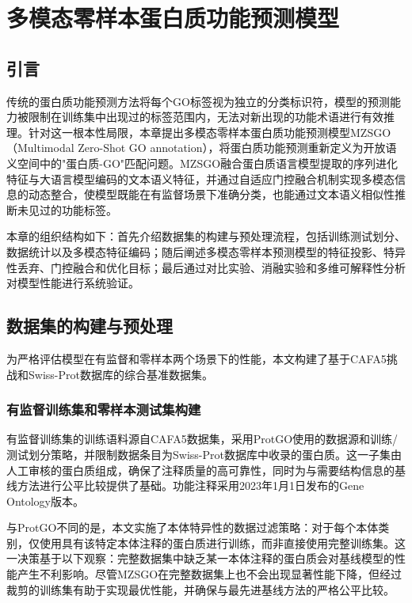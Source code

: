 
\chapter{多模态零样本蛋白质功能预测模型}

\section{引言}

传统的蛋白质功能预测方法将每个GO标签视为独立的分类标识符，模型的预测能力被限制在训练集中出现过的标签范围内，无法对新出现的功能术语进行有效推理。针对这一根本性局限，本章提出多模态零样本蛋白质功能预测模型MZSGO（Multimodal Zero-Shot GO annotation），将蛋白质功能预测重新定义为开放语义空间中的"蛋白质-GO"匹配问题。MZSGO融合蛋白质语言模型提取的序列进化特征与大语言模型编码的文本语义特征，并通过自适应门控融合机制实现多模态信息的动态整合，使模型既能在有监督场景下准确分类，也能通过文本语义相似性推断未见过的功能标签。

本章的组织结构如下：首先介绍数据集的构建与预处理流程，包括训练测试划分、数据统计以及多模态特征编码；随后阐述多模态零样本预测模型的特征投影、特异性丢弃、门控融合和优化目标；最后通过对比实验、消融实验和多维可解释性分析对模型性能进行系统验证。

\section{数据集的构建与预处理}\label{sec:mzsgo_datasets}

为严格评估模型在有监督和零样本两个场景下的性能，本文构建了基于CAFA5挑战和Swiss-Prot数据库\cite{boutet2007uniprotkb}的综合基准数据集。

\subsection{有监督训练集和零样本测试集构建}

有监督训练集的训练语料源自CAFA5数据集，采用ProtGO\cite{wang2025protgo}使用的数据源和训练/测试划分策略，并限制数据条目为Swiss-Prot数据库中收录的蛋白质。这一子集由人工审核的蛋白质组成，确保了注释质量的高可靠性，同时为与需要结构信息的基线方法进行公平比较提供了基础。功能注释采用2023年1月1日发布的Gene Ontology版本。

与ProtGO不同的是，本文实施了本体特异性的数据过滤策略：对于每个本体类别，仅使用具有该特定本体注释的蛋白质进行训练，而非直接使用完整训练集。这一决策基于以下观察：完整数据集中缺乏某一本体注释的蛋白质会对基线模型的性能产生不利影响。尽管MZSGO在完整数据集上也不会出现显著性能下降，但经过裁剪的训练集有助于实现最优性能，并确保与最先进基线方法的严格公平比较。


